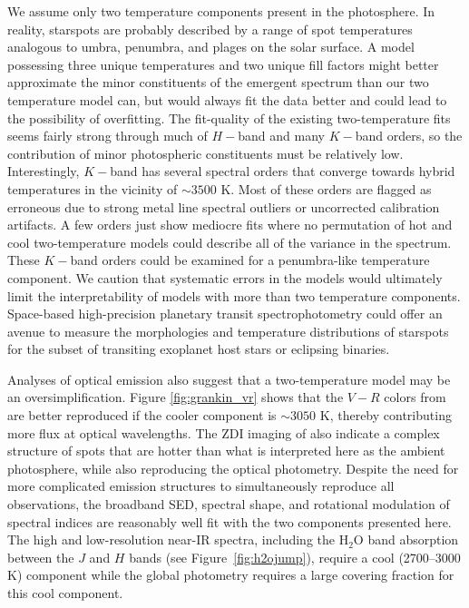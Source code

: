 \documentclass[twocolumn]{emulateapj}%
\begin{document}
We assume only two temperature components present in the photosphere.  In reality, starspots are probably described by a range of spot temperatures analogous to umbra, penumbra, and plages on the solar surface.  A model possessing three unique temperatures and two unique fill factors might better approximate the minor constituents of the emergent spectrum than our two temperature model can, but would always fit the data better and could lead to the possibility of overfitting.  The fit-quality of the existing two-temperature fits seems fairly strong through much of $H-$band and many $K-$band orders, so the contribution of minor photospheric constituents must be relatively low.  Interestingly, $K-$band has several spectral orders that converge towards hybrid temperatures in the vicinity of $\sim3500$ K.  Most of these orders are flagged as erroneous due to strong metal line spectral outliers or uncorrected calibration artifacts.  A few orders just show mediocre fits where no permutation of hot and cool two-temperature models could describe all of the variance in the spectrum.  These $K-$band orders could be examined for a penumbra-like temperature component.  We caution that systematic errors in the models would ultimately limit the interpretability of models with more than two temperature components.  Space-based high-precision planetary transit spectrophotometry could offer an avenue to measure the morphologies and temperature distributions of starspots for the subset of transiting exoplanet host stars or eclipsing binaries.

Analyses of optical emission also suggest that a two-temperature model may be an oversimplification.  Figure \ref{fig:grankin_vr} shows that the $V-R$ colors from \citet{grankin08} are better reproduced if the cooler component is $\sim 3050$ K, thereby contributing more flux at optical wavelengths.  The ZDI imaging of \citet{donati14} also indicate a complex structure of spots that are hotter than what is interpreted here as the ambient photosphere, while also reproducing the optical photometry.  Despite the need for more complicated emission structures to simultaneously reproduce all observations, the broadband SED, spectral shape, and rotational modulation of spectral indices are reasonably well fit with the two components presented here.  The high and low-resolution near-IR spectra, including the H$_2$O band absorption between the $J$ and $H$ bands (see Figure~\ref{fig:h2ojump}), require a cool (2700--3000 K) component while the global photometry requires a large covering fraction for this cool component.  
\end{document}
